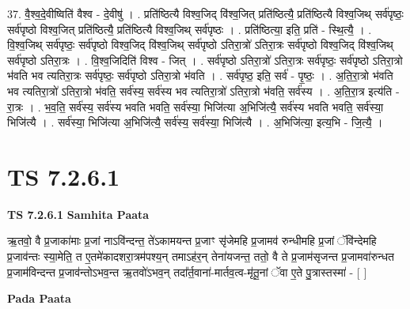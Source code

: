 \documentclass[17pt]{extarticle}
\begin{document}
37. वै॒श्व॒दे॒वीष्विति॑ वैश्व - दे॒वीषु॑ । . प्रति॑ष्ठित्यै विश्व॒जिद् वि॑श्व॒जित् प्रति॑ष्ठित्यै॒ प्रति॑ष्ठित्यै विश्व॒जिथ् सर्व॑पृष्ठः॒ सर्व॑पृष्ठो विश्व॒जित् प्रति॑ष्ठित्यै॒ प्रति॑ष्ठित्यै विश्व॒जिथ् सर्व॑पृष्ठः । . प्रति॑ष्ठित्या॒ इति॒ प्रति॑ - स्थि॒त्यै॒ । . वि॒श्व॒जिथ् सर्व॑पृष्ठः॒ सर्व॑पृष्ठो विश्व॒जिद् वि॑श्व॒जिथ् सर्व॑पृष्ठो ऽतिरा॒त्रो॑ ऽतिरा॒त्रः सर्व॑पृष्ठो विश्व॒जिद् वि॑श्व॒जिथ् सर्व॑पृष्ठो ऽतिरा॒त्रः । . वि॒श्व॒जिदिति॑ विश्व - जित् । . सर्व॑पृष्ठो ऽतिरा॒त्रो॑ ऽतिरा॒त्रः सर्व॑पृष्ठः॒ सर्व॑पृष्ठो ऽतिरा॒त्रो भ॑वति भव त्यतिरा॒त्रः सर्व॑पृष्ठः॒ सर्व॑पृष्ठो ऽतिरा॒त्रो भ॑वति । . सर्व॑पृष्ठ॒ इति॒ सर्व॑ - पृ॒ष्ठः॒ । . अ॒ति॒रा॒त्रो भ॑वति भव त्यतिरा॒त्रो॑ ऽतिरा॒त्रो भ॑वति॒ सर्व॑स्य॒ सर्व॑स्य भव त्यतिरा॒त्रो॑ ऽतिरा॒त्रो भ॑वति॒ सर्व॑स्य । . अ॒ति॒रा॒त्र इत्य॑ति - रा॒त्रः । . भ॒व॒ति॒ सर्व॑स्य॒ सर्व॑स्य भवति भवति॒ सर्व॑स्या॒ भिजि॑त्या अ॒भिजि॑त्यै॒ सर्व॑स्य भवति भवति॒ सर्व॑स्या॒ भिजि॑त्यै । . सर्व॑स्या॒ भिजि॑त्या अ॒भिजि॑त्यै॒ सर्व॑स्य॒ सर्व॑स्या॒ भिजि॑त्यै । . अ॒भिजि॑त्या॒ इत्य॒भि - जि॒त्यै॒ । \newline
\pagebreak
{}

\section{ TS 7.2.6.1 }

\textbf{TS 7.2.6.1 } \newline
\textbf{Samhita Paata} \newline

ऋ॒तवो॒ वै प्र॒जाका॑माः प्र॒जां नाऽवि॑न्दन्त॒ ते॑ऽकामयन्त प्र॒जाꣳ सृ॑जेमहि प्र॒जामव॑ रुन्धीमहि प्र॒जां ॅवि॑न्देमहि प्र॒जाव॑न्तः स्या॒मेति॒ त ए॒तमे॑कादशरा॒त्रम॑पश्य॒न् तमाऽह॑र॒न् तेना॑यजन्त॒ ततो॒ वै ते प्र॒जाम॑सृजन्त प्र॒जामवा॑रुन्धत प्र॒जाम॑विन्दन्त प्र॒जाव॑न्तोऽभव॒न्त ऋ॒तवो॑ऽभव॒न् तदा᳚र्त॒वाना॑-मार्तव॒त्व-मृ॑तू॒नां ॅवा ए॒ते पु॒त्रास्तस्मा॑ - [  ] \newline

\textbf{Pada Paata} \newline
\end{document}
